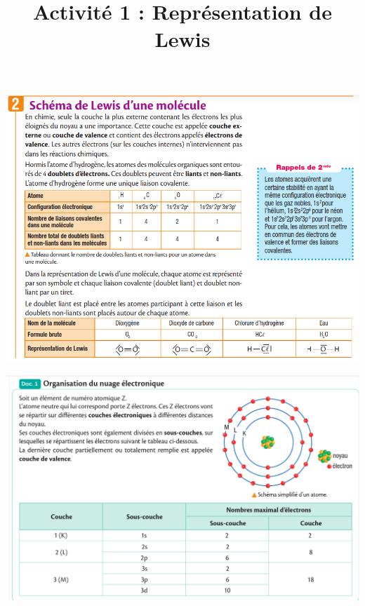 \documentclass[10pt]{article}
\newcommand{\titreActivite}{\huge Activité 1 : Représentation de Lewis} %
\begin{document}
\date{}
\title{\titreActivite}
\maketitle %


\begin{center}

	\includegraphics[scale=0.45]{assets/cours.png}

	\vspace{20pt}
	\includegraphics[scale=0.4]{assets/doc1.png}

	\pagebreak{}


\end{center}
\end{document}
